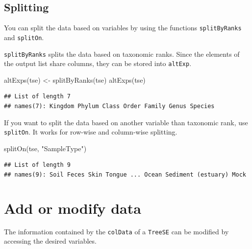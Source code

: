 \documentclass[
]{book}
\newenvironment{Shaded}{\begin{snugshade}}{\end{snugshade}}
\newcommand{\CommentTok}[1]{\textcolor[rgb]{0.56,0.35,0.01}{\textit{#1}}}
\newcommand{\FunctionTok}[1]{\textcolor[rgb]{0.00,0.00,0.00}{#1}}
\newcommand{\NormalTok}[1]{#1}
\newcommand{\OtherTok}[1]{\textcolor[rgb]{0.56,0.35,0.01}{#1}}
\newcommand{\SpecialCharTok}[1]{\textcolor[rgb]{0.00,0.00,0.00}{#1}}
\newcommand{\StringTok}[1]{\textcolor[rgb]{0.31,0.60,0.02}{#1}}
\begin{document}
\hypertarget{splitting}{%
\subsection{Splitting}\label{splitting}}

You can split the data based on variables by using the functions \texttt{splitByRanks}
and \texttt{splitOn}.

\texttt{splitByRanks} splits the data based on taxonomic ranks. Since the elements of the output list
share columns, they can be stored into \texttt{altExp}.

\begin{Shaded}
\begin{Highlighting}[]
\FunctionTok{altExps}\NormalTok{(tse) }\OtherTok{\textless{}{-}} \FunctionTok{splitByRanks}\NormalTok{(tse)}
\FunctionTok{altExps}\NormalTok{(tse)}
\end{Highlighting}
\end{Shaded}

\begin{verbatim}
## List of length 7
## names(7): Kingdom Phylum Class Order Family Genus Species
\end{verbatim}

If you want to split the data based on another variable than taxonomic rank, use
\texttt{splitOn}. It works for row-wise and column-wise splitting.

\begin{Shaded}
\begin{Highlighting}[]
\FunctionTok{splitOn}\NormalTok{(tse, }\StringTok{"SampleType"}\NormalTok{)}
\end{Highlighting}
\end{Shaded}

\begin{verbatim}
## List of length 9
## names(9): Soil Feces Skin Tongue ... Ocean Sediment (estuary) Mock
\end{verbatim}

\hypertarget{add-or-modify-data}{%
\section{Add or modify data}\label{add-or-modify-data}}

The information contained by the \texttt{colData} of a \texttt{TreeSE} can be modified by
accessing the desired variables.

\begin{Shaded}
\end{Shaded}
\end{document}
